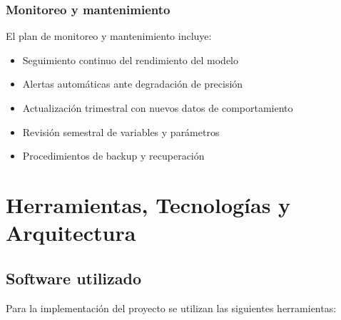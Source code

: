 \subsubsection{Monitoreo y mantenimiento}
El plan de monitoreo y mantenimiento incluye:

\begin{itemize}
    \item Seguimiento continuo del rendimiento del modelo
    \item Alertas automáticas ante degradación de precisión
    \item Actualización trimestral con nuevos datos de comportamiento
    \item Revisión semestral de variables y parámetros
    \item Procedimientos de backup y recuperación
\end{itemize}
\newpage

\section{Herramientas, Tecnologías y Arquitectura}
\subsection{Software utilizado}
Para la implementación del proyecto se utilizan las siguientes herramientas:

